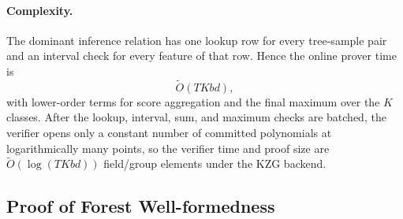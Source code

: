 \paragraph{Complexity.}
The dominant inference relation has one lookup row for every
tree-sample pair and an interval check for every feature of that row. Hence the
online prover time is
\[
    \tilde{O}(TKbd),
\]
with lower-order terms for score aggregation and the final maximum over the
$K$ classes. After the lookup, interval, sum, and maximum checks are batched,
the verifier opens only a constant number of committed polynomials at
logarithmically many points, so the verifier time and proof size are
$\tilde{O}(\log(TKbd))$ field/group elements under the KZG backend.

\subsection{Proof of Forest Well-formedness}\label{subsec:method-well-formedness}\label{subsec:proof of well-formedness}

